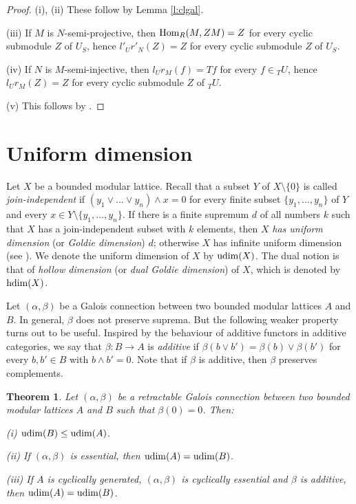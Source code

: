\documentclass[11pt,a4paper]{amsart}
\newtheorem{thm}[theorem]{Theorem}
\begin{document}
\begin{proof} (i), (ii) These follow by Lemma \ref{l:clgal}.

(iii) If $M$ is $N$-semi-projective, then ${{\rm Hom}}_R(M,ZM)=Z$ for every cyclic submodule $Z$ of $U_S$, hence
$l'_Ur'_N(Z)=Z$ for every cyclic submodule $Z$ of $U_S$.

(iv) If $N$ is $M$-semi-injective, then $l_Ur_M(f)=Tf$ for every $f\in {}_TU$, hence $l_Ur_M(Z)=Z$ for every cyclic
submodule $Z$ of ${}_TU$.

(v) This follows by \cite[Proposition~1.1]{Z}.
\end{proof}

\section{Uniform dimension}

Let $X$ be a bounded modular lattice. Recall that a subset $Y$ of $X\setminus \{0\}$ is called
\emph{join-independent} if $(y_1\vee \ldots \vee y_n)\wedge x=0$ for every finite subset $\{y_1,\dots,y_n\}$ of $Y$
and every $x\in Y\setminus \{y_1,\dots,y_n\}$. If there is a finite supremum $d$ of all numbers $k$ such that $X$
has a join-independent subset with $k$ elements, then $X$ \emph{has uniform dimension} (or \emph{Goldie dimension}) $d$;
otherwise $X$ has infinite uniform dimension (see \cite[Theorem~5]{GP}). We denote the uniform dimension of $X$
by ${\rm udim}(X)$. The dual notion is that of \emph{hollow dimension} (or \emph{dual Goldie dimension}) of $X$, which 
is denoted by ${\rm hdim}(X)$.

Let $(\alpha,\beta)$ be a Galois connection between two bounded modular lattices $A$ and $B$. In general, $\beta$ does
not preserve suprema. But the following weaker property turns out to be useful. Inspired by the behaviour of additive
functors in additive categories, we say that $\beta:B\to A$ is \emph{additive} if $\beta(b\vee b')=\beta(b)\vee
\beta(b')$ for every $b,b'\in B$ with $b\wedge b'=0$. Note that if $\beta$ is additive, then $\beta$ preserves
complements.

\begin{thm} \label{t:udim} Let $(\alpha,\beta)$ be a retractable Galois connection between two bounded modular lattices
$A$ and $B$ such that $\beta(0)=0$. Then:

(i) ${\rm udim}(B)\leq {\rm udim}(A)$. 

(ii) If $(\alpha,\beta)$ is essential, then ${\rm udim}(A)={\rm udim}(B)$. 

(iii) If $A$ is cyclically generated, $(\alpha,\beta)$ is cyclically essential and $\beta$ is additive, then ${\rm
udim}(A)={\rm udim}(B)$. 
\end{thm}
\end{document}
